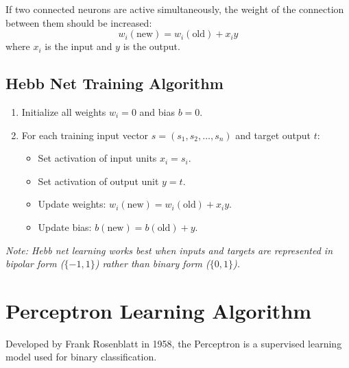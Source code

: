 \documentclass[12pt,a4paper]{article}
\begin{document}
\begin{tcolorbox}[defbox, title={Hebbian Learning Rule}]
If two connected neurons are active simultaneously, the weight of the connection between them should be increased:
\begin{equation}
  w_i(\text{new}) = w_i(\text{old}) + x_i y
\end{equation}
where $x_i$ is the input and $y$ is the output.
\end{tcolorbox}

\subsection{Hebb Net Training Algorithm}
\begin{enumerate}[leftmargin=*, itemsep=2.5pt]
  \item Initialize all weights $w_i = 0$ and bias $b = 0$.
  \item For each training input vector $s = (s_1, s_2, \ldots, s_n)$ and target output $t$:
    \begin{itemize}[leftmargin=1.5em, itemsep=1.5pt]
      \item Set activation of input units $x_i = s_i$.
      \item Set activation of output unit $y = t$.
      \item Update weights: $w_i(\text{new}) = w_i(\text{old}) + x_i y$.
      \item Update bias: $b(\text{new}) = b(\text{old}) + y$.
    \end{itemize}
\end{enumerate}
\textit{Note: Hebb net learning works best when inputs and targets are represented in bipolar form ($\{-1, 1\}$) rather than binary form ($\{0, 1\}$).}

\section{Perceptron Learning Algorithm}

Developed by Frank Rosenblatt in 1958, the Perceptron is a supervised learning model used for binary classification.
\end{document}
